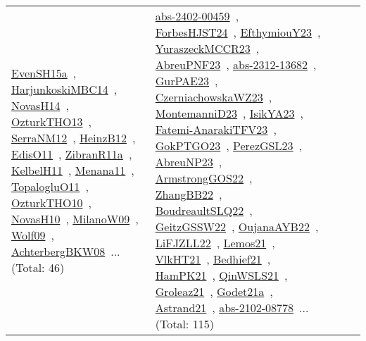 {\begin{longtable}{lp{3cm}>{\raggedright\arraybackslash}p{6cm}>{\raggedright\arraybackslash}p{6cm}>{\raggedright\arraybackslash}p{8cm}}
\href{../works/EvenSH15a.pdf}{EvenSH15a}~\cite{EvenSH15a}, \href{../works/HarjunkoskiMBC14.pdf}{HarjunkoskiMBC14}~\cite{HarjunkoskiMBC14}, \href{../works/NovasH14.pdf}{NovasH14}~\cite{NovasH14}, \href{../works/OzturkTHO13.pdf}{OzturkTHO13}~\cite{OzturkTHO13}, \href{../works/SerraNM12.pdf}{SerraNM12}~\cite{SerraNM12}, \href{../works/HeinzB12.pdf}{HeinzB12}~\cite{HeinzB12}, \href{../works/EdisO11.pdf}{EdisO11}~\cite{EdisO11}, \href{../works/ZibranR11a.pdf}{ZibranR11a}~\cite{ZibranR11a}, \href{../works/KelbelH11.pdf}{KelbelH11}~\cite{KelbelH11}, \href{../works/Menana11.pdf}{Menana11}~\cite{Menana11}, \href{../works/TopalogluO11.pdf}{TopalogluO11}~\cite{TopalogluO11}, \href{../works/OzturkTHO10.pdf}{OzturkTHO10}~\cite{OzturkTHO10}, \href{../works/NovasH10.pdf}{NovasH10}~\cite{NovasH10}, \href{../works/MilanoW09.pdf}{MilanoW09}~\cite{MilanoW09}, \href{../works/Wolf09.pdf}{Wolf09}~\cite{Wolf09}, \href{../works/AchterbergBKW08.pdf}{AchterbergBKW08}~\cite{AchterbergBKW08}... (Total: 46) & \href{../works/abs-2402-00459.pdf}{abs-2402-00459}~\cite{abs-2402-00459}, \href{../works/ForbesHJST24.pdf}{ForbesHJST24}~\cite{ForbesHJST24}, \href{../works/EfthymiouY23.pdf}{EfthymiouY23}~\cite{EfthymiouY23}, \href{../works/YuraszeckMCCR23.pdf}{YuraszeckMCCR23}~\cite{YuraszeckMCCR23}, \href{../works/AbreuPNF23.pdf}{AbreuPNF23}~\cite{AbreuPNF23}, \href{../works/abs-2312-13682.pdf}{abs-2312-13682}~\cite{abs-2312-13682}, \href{../works/GurPAE23.pdf}{GurPAE23}~\cite{GurPAE23}, \href{../works/CzerniachowskaWZ23.pdf}{CzerniachowskaWZ23}~\cite{CzerniachowskaWZ23}, \href{../works/MontemanniD23.pdf}{MontemanniD23}~\cite{MontemanniD23}, \href{../works/IsikYA23.pdf}{IsikYA23}~\cite{IsikYA23}, \href{../works/Fatemi-AnarakiTFV23.pdf}{Fatemi-AnarakiTFV23}~\cite{Fatemi-AnarakiTFV23}, \href{../works/GokPTGO23.pdf}{GokPTGO23}~\cite{GokPTGO23}, \href{../works/PerezGSL23.pdf}{PerezGSL23}~\cite{PerezGSL23}, \href{../works/AbreuNP23.pdf}{AbreuNP23}~\cite{AbreuNP23}, \href{../works/ArmstrongGOS22.pdf}{ArmstrongGOS22}~\cite{ArmstrongGOS22}, \href{../works/ZhangBB22.pdf}{ZhangBB22}~\cite{ZhangBB22}, \href{../works/BoudreaultSLQ22.pdf}{BoudreaultSLQ22}~\cite{BoudreaultSLQ22}, \href{../works/GeitzGSSW22.pdf}{GeitzGSSW22}~\cite{GeitzGSSW22}, \href{../works/OujanaAYB22.pdf}{OujanaAYB22}~\cite{OujanaAYB22}, \href{../works/LiFJZLL22.pdf}{LiFJZLL22}~\cite{LiFJZLL22}, \href{../works/Lemos21.pdf}{Lemos21}~\cite{Lemos21}, \href{../works/VlkHT21.pdf}{VlkHT21}~\cite{VlkHT21}, \href{../works/Bedhief21.pdf}{Bedhief21}~\cite{Bedhief21}, \href{../works/HamPK21.pdf}{HamPK21}~\cite{HamPK21}, \href{../works/QinWSLS21.pdf}{QinWSLS21}~\cite{QinWSLS21}, \href{../works/Groleaz21.pdf}{Groleaz21}~\cite{Groleaz21}, \href{../works/Godet21a.pdf}{Godet21a}~\cite{Godet21a}, \href{../works/Astrand21.pdf}{Astrand21}~\cite{Astrand21}, \href{../works/abs-2102-08778.pdf}{abs-2102-08778}~\cite{abs-2102-08778}... (Total: 115)\\

\end{longtable}}
